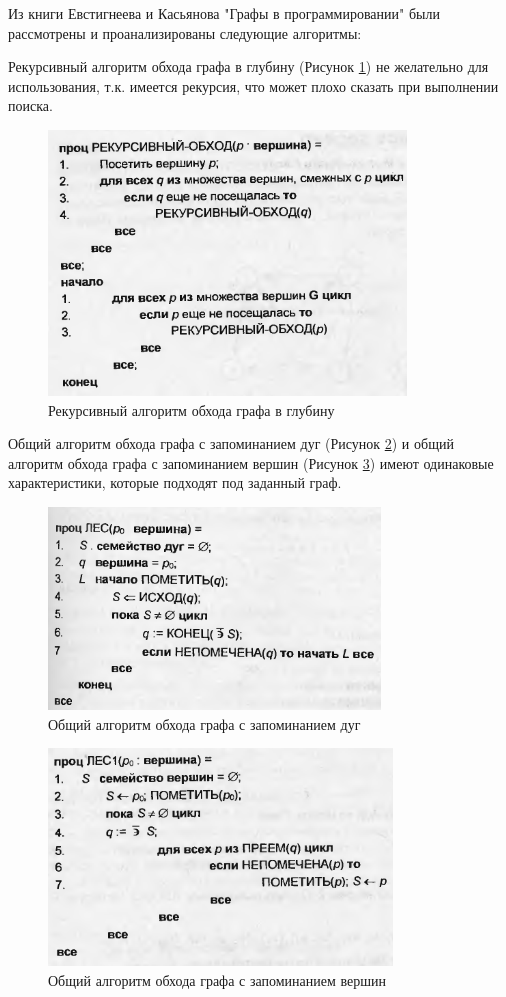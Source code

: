 \def\notedate{2023.01.10}
\def\currentauthor{Журавлев Н.В. (РК6-72Б)}
Из книги Евстигнеева и Касьянова "Графы в программировании" были рассмотрены и проанализированы следующие алгоритмы\cite{eg-graph}:

Рекурсивный алгоритм обхода графа в глубину (Рисунок \ref{fig:rec}) не желательно для использования, т.к. имеется рекурсия, что может плохо сказать при выполнении поиска.

\begin{figure}[h!]
    \centering
    \includegraphics[width=0.4\linewidth]{ResearchNotes/rndhpc_int_edt_2023_01_10/rec.png}
    \caption{Рекурсивный алгоритм обхода графа в глубину}
    \label{fig:rec}
\end{figure}

Общий алгоритм обхода графа с запоминанием дуг (Рисунок \ref{fig:save_arc}) и общий алгоритм обхода графа с запоминанием вершин (Рисунок \ref{fig:save_eages}) имеют одинаковые характеристики, которые подходят под заданный граф.

\begin{figure}[h!]
    \centering
    \includegraphics[width=0.4\linewidth]{ResearchNotes/rndhpc_int_edt_2023_01_10/save_arc.png}
    \caption{Общий алгоритм обхода графа с запоминанием дуг}
    \label{fig:save_arc}
\end{figure}

\begin{figure}[h!]
    \centering
    \includegraphics[width=0.4\linewidth]{ResearchNotes/rndhpc_int_edt_2023_01_10/save_eages.png}
    \caption{Общий алгоритм обхода графа с запоминанием вершин}
    \label{fig:save_eages}
\end{figure}

